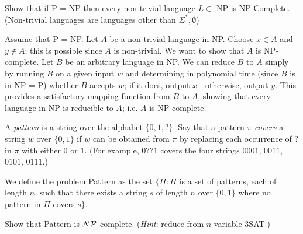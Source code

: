 \documentclass[solution, letterpaper]{cs121}
\begin{document}

\newcommand{\PSPACE}{\mathrm{PSPACE}}
\newcommand{\NPSPACE}{\mathrm{NPSPACE}}
\newcommand{\AD}{\mathsc{Amicable Divorce}}
\newcommand{\HD}{\mathsc{Hostile Divorce}}
\renewcommand{\P}{\mathrm{P}}




Show that if P = NP then every non-trivial language $L \in$ NP is NP-Complete. (Non-trivial languages are languages other than $\Sigma^*, \emptyset$)

\begin{solution}
Assume that P = NP.  Let $A$ be a non-trivial language in NP.  Choose $x \in A$ and $y \notin A$; this is possible since $A$ is non-trivial.  We want to show that $A$ is NP-complete.  Let $B$ be an arbitrary language in NP.  We can reduce $B$ to $A$ simply by running $B$ on a given input $w$ and determining in polynomial time (since $B$ is in NP = P) whether $B$ accepts $w$; if it does, output $x$ - otherwise, output $y$.  This provides a satisfactory mapping function from $B$ to $A$, showing that every language in NP is reducible to $A$; i.e. $A$ is NP-complete.
\end{solution}



A {\it pattern} is a string over the alphabet $\{0,1, ?\}$.  Say that
        a
        pattern $\pi$ {\it covers} a string $w$ over $\{0,1\}$ if
        $w$ can be obtained from $\pi$ by replacing each occurrence of
        $?$ in $\pi$ with either $0$ or $1$.  (For example, $0??1$ covers the
        four strings $0001$, $0011$, $0101$, $0111$.)

        We define the problem {\sc Pattern} as the set $\{\Pi : \Pi$ is a set
        of patterns, each of length $n$, such that there exists a string $s$
        of length
        $n$ over $\{0,1\}$ where no pattern in $\Pi$ covers $s\}$.

        Show that {\sc Pattern} is ${\cal NP}$-complete.  (\emph{Hint}:
        reduce from $n$-variable {\sc 3SAT}.)
\end{document}
